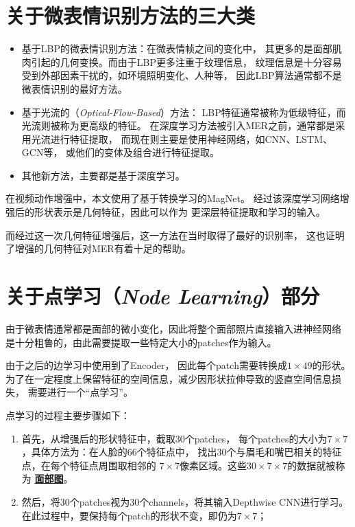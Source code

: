 \documentclass[AutoFakeBold]{MyFormat}
\begin{document}
\section{关于微表情识别方法的三大类}
\begin{itemize}
    \item 基于LBP的微表情识别方法：在微表情帧之间的变化中，
    其更多的是面部肌肉引起的几何变换。而由于LBP更多注重于纹理信息，
    纹理信息是十分容易受到外部因素干扰的，如环境照明变化、人种等，
    因此LBP算法通常都不是微表情识别的最好方法。
    \item 基于光流的（\textit{Optical-Flow-Based}）方法：
    LBP特征通常被称为低级特征，而光流则被称为更高级的特征。
    在深度学习方法被引入MER之前，通常都是采用光流进行特征提取，
    而现在则主要是使用神经网络，如CNN、LSTM、GCN等，
    或他们的变体及组合进行特征提取。
    \item 其他新方法，主要都是基于深度学习。
\end{itemize}
\par 在视频动作增强中，本文使用了基于转换学习的MagNet。
经过该深度学习网络增强后的形状表示是几何特征，因此可以作为
更深层特征提取和学习的输入。
\par 而经过这一次几何特征增强后，这一方法在当时取得了最好的识别率，
这也证明了增强的几何特征对MER有着十足的帮助。


\section{关于点学习（\textit{Node Learning}）部分}
\par 由于微表情通常都是面部的微小变化，因此将整个面部照片直接输入进神经网络
是十分粗鲁的，由此需要提取一些特定大小的patches作为输入。
\par 由于之后的边学习中使用到了Encoder，
因此每个patch需要转换成$1\times 49$的形状。
为了在一定程度上保留特征的空间信息，减少因形状拉伸导致的竖直空间信息损失，
需要进行一个“点学习”。
\par 点学习的过程主要步骤如下：
\begin{enumerate}
    \item 首先，从增强后的形状特征中，截取30个patches，
    每个patches的大小为$7\times 7$，具体方法为：在人脸的66个特征点中，
    找出30个与眉毛和嘴巴相关的特征点，在每个特征点周围取相邻的
    $7\times 7$像素区域。这些$30\times 7\times 7$的数据就被称为
    \textbf{\Large \underline{面部图}}。
    \item 然后，将30个patches视为30个channels，将其输入Depthwise CNN进行学习。
    在此过程中，要保持每个patch的形状不变，即仍为$7\times 7$；
\end{enumerate}
\end{document}
